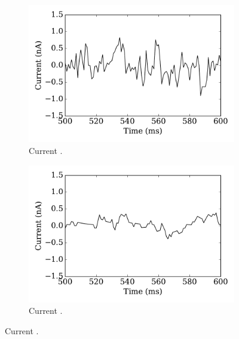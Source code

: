 \begin{figure}[tbp!]
		\label{Fig:spike_curr}
	\end{figure}

	\begin{figure}[tbp!]
		\centering
		  \par
		\begin{subfigure}[t]{0.43\textwidth}
			\includegraphics[width=\textwidth]{pics_iconip/curr_tau1.pdf}
			\caption{Current \DIFdelbeginFL {}\DIFdelendFL \DIFaddbeginFL {}\DIFaddendFL .}
		\end{subfigure}
		\begin{subfigure}[t]{0.43\textwidth}
			\includegraphics[width=\textwidth]{pics_iconip/curr_tau10.pdf}
			\caption{Current \DIFdelbeginFL {}\DIFdelendFL \DIFaddbeginFL {}\DIFaddendFL .}

\end{subfigure}
\end{figure}
